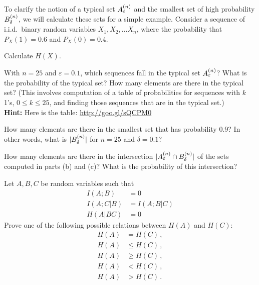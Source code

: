 \documentclass[a4paper,10pt,landscape,twocolumn]{scrartcl}
\begin{document}
\begin{exercise}
To clarify the notion of a typical set $A^{(n)}_{\varepsilon}$ and the smallest set of high probability $B^{(n)}_{\delta}$, we will calculate these sets for a simple example. Consider a sequence of i.i.d.\ binary random variables $X_1, X_2, . . . X_n$, where the probability that $P_X(1) = 0.6$ and $P_X(0) = 0.4$.
	\begin{subex}[(1pt)]
	Calculate $H(X)$.
	\end{subex}
	\begin{subex}[(3pt)]
	With $n = 25$ and $\varepsilon = 0.1$, which sequences fall in the typical set $A^{(n)}_{\varepsilon}$? What is the probability of the typical set? How many elements are there in the typical set? (This involves computation of a table of probabilities for sequences with $k$ 1's, $0 \leq k \leq 25$, and finding those sequences that are in the typical set.)
\\\textbf{Hint:} Here is the table: \url{http://goo.gl/sQCPM0}
	\end{subex}
	\begin{subex}[(2pt)]
	How many elements are there in the smallest set that has probability 0.9? In other words, what is $|B^{(n)}_{\delta}|$ for $n = 25$ and $\delta = 0.1$?
	\end{subex}
	\begin{subex}[(2pt)]
	How many elements are there in the intersection $|A^{(n)}_{\varepsilon} \cap B^{(n)}_{\delta}|$ of the sets computed in parts (b) and (c)? What is the probability of this intersection?
	\end{subex}
\end{exercise}

\begin{exercise}
Let $A,B,C$ be random variables such that
\begin{align*}
I(A;B) &= 0\\
I(A;C|B) &= I(A;B|C)\\
H(A|BC) &= 0
\end{align*}
Prove one of the following possible relations between $H(A)$ and $H(C)$:
\begin{align*}
H(A)&=H(C) \, ,\\
H(A) &\leq H(C) \, ,\\
H(A) &\geq H(C) \, ,\\
H(A) &< H(C) \, ,\\
H(A) &> H(C) \, .
\end{align*}
\end{exercise}
\end{document}
